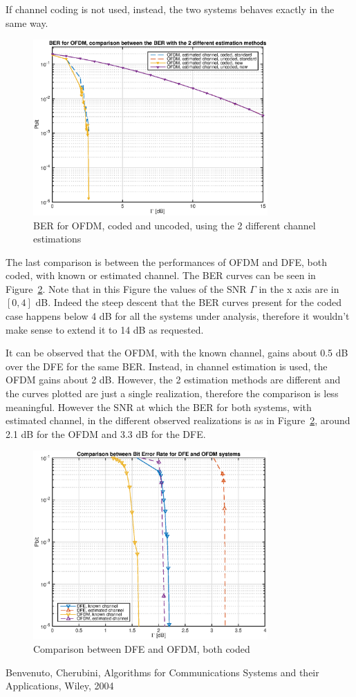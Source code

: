 \documentclass[10pt]{article}
\begin{document}
If channel coding is not used, instead, the two systems behaves exactly in the same way.
\begin{figure}[h!]
	\centering
	\includegraphics[width = 0.8\textwidth]{OFDM_BER_est_comparison}
	\caption{BER for OFDM, coded and uncoded, using the 2 different channel estimations}
	\label{fig:BEROFDM_comparison}
\end{figure}

The last comparison is between the performances of OFDM and DFE, both coded, with known or estimated channel. The BER curves can be seen in Figure~\ref{fig:DFEOFDM}. Note that in this Figure the values of the SNR $\Gamma$ in the x axis are in $[0, 4]$ dB. Indeed the steep descent that the BER curves present for the coded case happens below 4 dB for all the systems under analysis, therefore it wouldn't make sense to extend it to 14 dB as requested. 

It can be observed that the OFDM, with the known channel, gains about 0.5 dB over the DFE for the same BER. Instead, in channel estimation is used, the OFDM gains about 2 dB. However, the 2 estimation methods are different and the curves plotted are just a single realization, therefore the comparison is less meaningful. However the SNR at which the BER for both systems, with estimated channel, in the different observed realizations is as in Figure~\ref{fig:DFEOFDM}, around 2.1 dB for the OFDM and 3.3 dB for the DFE.

\begin{figure}[h!]
	\centering
	\includegraphics[width = 0.8\textwidth]{OFDMDFE}
	\caption{Comparison between DFE and OFDM, both coded}
	\label{fig:DFEOFDM}
\end{figure}

\begin{thebibliography}{10}

Benvenuto, Cherubini, Algorithms for Communications Systems and their Applications, Wiley, 2004

\end{thebibliography}
\end{document}
